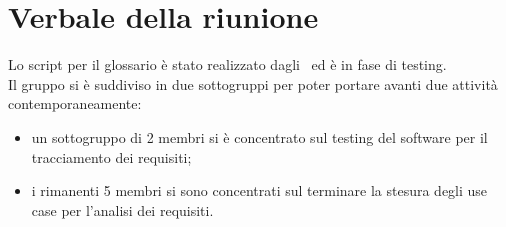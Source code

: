\documentclass[../Riunione16-01-13.tex]{subfiles}
\begin{document}
\section{Verbale della riunione}
Lo script per il glossario è stato realizzato dagli \amministratori\ ed è in fase di testing. \\
Il gruppo si è suddiviso in due sottogruppi per poter portare avanti due attività contemporaneamente:
\begin{itemize}
	\item un sottogruppo di 2 membri si è concentrato sul testing del software per il tracciamento dei requisiti;
	\item i rimanenti 5 membri si sono concentrati sul terminare la stesura degli use case per l'analisi dei requisiti.
\end{itemize}
\end{document}
